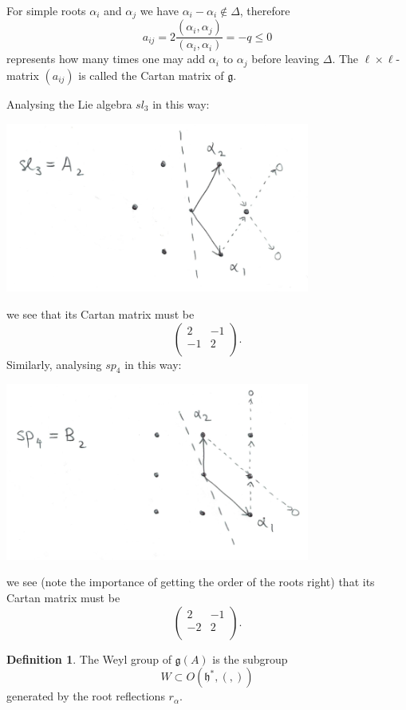 \documentclass[12pt]{article}
\theoremstyle{plain}
\theoremstyle{definition}
\newtheorem{defn}{Definition}[section]
\numberwithin{equation}{section}
\newcommand{\al}{\alpha}
\newcommand{\la}{\lambda}
\newcommand{\D}{\Delta}
\newcommand{\g}{\mathfrak{g}}
\newcommand{\h}{\mathfrak{h}}
\newcommand{\tbt}[4]{\left(\begin{array}{cc} #1 & #2 \\ #3 & #4 \\ \end{array}\right)}
\begin{document}
For simple roots $\alpha_i$ and $\alpha_j$ we have $\alpha_i - \alpha_i \notin \D$, therefore
\[
a_{ij} = 2 \frac{(\alpha_i, \alpha_j)}{(\alpha_i, \alpha_i)} = -q \leq 0
\]
represents how many times one may add $\alpha_i$ to $\alpha_j$ before leaving $\Delta$. The $\ell \times \ell$-matrix $(a_{ij})$ is called the Cartan matrix of $\g$.

Analysing the Lie algebra $sl_3$ in this way:
\begin{center}
\includegraphics[width=100mm]{A2_Serre.png}
\end{center}
we see that its Cartan matrix must be
\[
\tbt{2}{-1}{-1}{2}.
\]
Similarly, analysing $sp_4$ in this way:
\begin{center}
\includegraphics[width=100mm]{B2_Serre.png}
\end{center}
we see (note the importance of getting the order of the roots right) that its Cartan matrix must be
\[
\tbt{2}{-1}{-2}{2}.
\]



\begin{defn}
The Weyl group of $\g(A)$ is the subgroup
\[
W \subset O(\h^*, (,))
\]
generated by the root reflections $r_\al$.
\end{defn}
\end{document}
